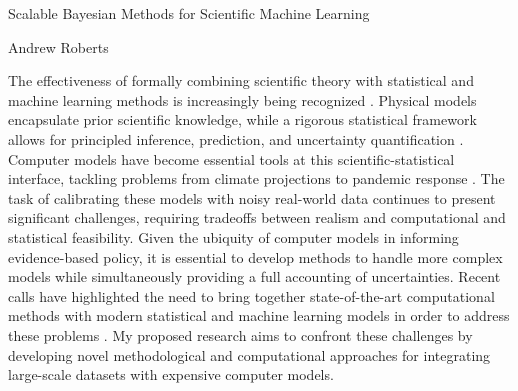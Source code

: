 \documentclass[12pt]{article}
\begin{document}
\begin{center}
Scalable Bayesian Methods for Scientific Machine Learning
\end{center}

\begin{flushright}
Andrew Roberts
\end{flushright} 

The effectiveness of formally combining scientific theory with statistical and machine learning methods is increasingly being recognized \cite{Willcox, Laubmeier, Wikle}. 
Physical models encapsulate prior scientific knowledge, while a rigorous statistical framework allows for principled inference, prediction, and uncertainty quantification \cite{Wikle}. Computer models have become essential tools at this scientific-statistical interface, tackling problems from 
climate projections \cite{Canadell} to pandemic response \cite{Swallow}. The task of calibrating these models with noisy real-world data continues to present
significant challenges, requiring tradeoffs between realism and computational and statistical feasibility. Given the ubiquity of computer models in informing
 evidence-based policy, it is essential to develop methods to handle more complex models while simultaneously providing a full accounting of uncertainties.
Recent calls have highlighted the need to bring together state-of-the-art computational methods with modern statistical 
and machine learning models in order to address these problems \cite{Wikle, Baker}. My proposed research aims to confront these challenges by developing novel methodological and computational approaches for integrating large-scale datasets with expensive computer models. 
\end{document}
